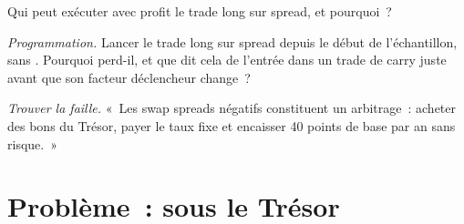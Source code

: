 \begin{exercise}[$\star\star$]\label{exo:s2:swap-spread-and-asset-swap-trades:6}
Qui peut exécuter avec profit le trade long sur spread, et pourquoi~?
\end{exercise}

\begin{exercise}[$\star\star\star$]\label{exo:s2:swap-spread-and-asset-swap-trades:7}
\emph{Programmation.} Lancer le trade long sur spread depuis le début de l'échantillon, sans . Pourquoi perd-il, et que dit cela de l'entrée dans un
trade de carry juste avant que son facteur déclencheur change~?
\end{exercise}

\begin{exercise}[$\star\star\star$]\label{exo:s2:swap-spread-and-asset-swap-trades:8}
\emph{Trouver la faille.} «~Les swap spreads négatifs constituent un arbitrage~: acheter des bons du Trésor, payer le taux fixe et encaisser 40 points de base par an sans risque.~»
\end{exercise}

\section{Problème~: sous le Trésor}

